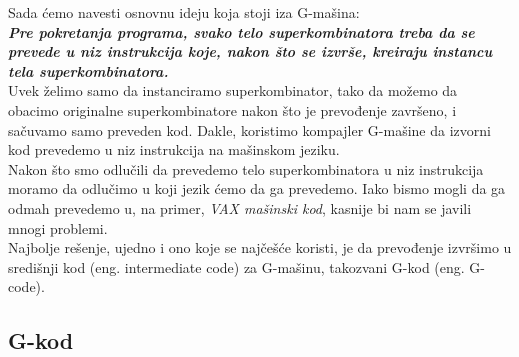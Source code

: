 Sada ćemo navesti osnovnu ideju koja stoji iza G-mašina: \\
\textbf{{\em Pre pokretanja programa, svako telo superkombinatora treba da se prevede u niz instrukcija koje, nakon što se izvrše, kreiraju instancu tela superkombinatora.}}\\

Uvek želimo samo da instanciramo superkombinator, tako da možemo da obacimo originalne superkombinatore nakon što je prevođenje završeno, i sačuvamo samo preveden kod. Dakle, koristimo kompajler G-mašine da izvorni kod prevedemo u niz instrukcija na mašinskom jeziku. \\

Nakon što smo odlučili da prevedemo telo superkombinatora u niz instrukcija moramo da odlučimo u koji jezik ćemo da ga prevedemo. Iako bismo mogli da ga odmah prevedemo u, na primer, {\em VAX mašinski kod}, kasnije bi nam se javili mnogi problemi.\\
Najbolje rešenje, ujedno i ono koje se najčešće koristi, je da prevođenje izvršimo u središnji kod (eng. intermediate code) za G-mašinu, takozvani G-kod (eng. G-code). \\

\subsection{G-kod}

